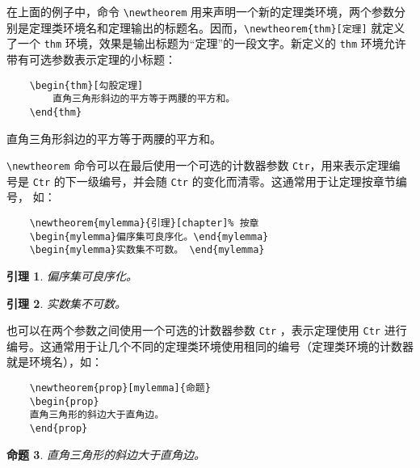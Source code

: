 在上面的例子中，命令 \verb|\newtheorem| 用来声明一个新的定理类环境，两个参数分别是定理类环境名和定理输出的标题名。因而，\verb|\newtheorem{thm}[定理]| 就定义了一个 \verb|thm| 环境，效果是输出标题为“定理”的一段文字。新定义的 \verb|thm| 环境允许带有可选参数表示定理的小标题：

\begin{minipage}[t]{0.45\textwidth}
\begin{lstlisting}
    \begin{thm}[勾股定理]
        直角三角形斜边的平方等于两腰的平方和。
    \end{thm}
\end{lstlisting}
\end{minipage}
\hfill
\begin{minipage}[t]{0.45\textwidth}
    \begin{thm}[勾股定理]
        直角三角形斜边的平方等于两腰的平方和。
    \end{thm}
\end{minipage}

\verb|\newtheorem| 命令可以在最后使用一个可选的计数器参数 \verb|Ctr|，用来表示定理编
号是 \verb|Ctr| 的下一级编号，并会随 \verb|Ctr| 的变化而清零。这通常用于让定理按章节编号，
如：

\begin{minipage}[t]{0.45\textwidth}
\begin{lstlisting}
    \newtheorem{mylemma}{引理}[chapter]% 按章
    \begin{mylemma}偏序集可良序化。\end{mylemma}
    \begin{mylemma}实数集不可数。 \end{mylemma}
\end{lstlisting}
\end{minipage}
\hfill
\begin{minipage}[t]{0.45\textwidth}
    \newtheorem{mylemma}{引理}[chapter]%
    \begin{mylemma}偏序集可良序化。\end{mylemma}
    \begin{mylemma}实数集不可数。 \end{mylemma}
\end{minipage}

也可以在两个参数之间使用一个可选的计数器参数 \verb|Ctr| ，表示定理使用 \verb|Ctr| 进行
编号。这通常用于让几个不同的定理类环境使用租同的编号（定理类环境的计数器就是环境名），如：

\begin{minipage}[t]{0.45\textwidth}
\begin{lstlisting}
    \newtheorem{prop}[mylemma]{命题}
    \begin{prop}
    直角三角形的斜边大于直角边。
    \end{prop}
\end{lstlisting}
\end{minipage}
\hfill
\begin{minipage}[t]{0.45\textwidth}
    \newtheorem{prop}[mylemma]{命题}
    \begin{prop}
    直角三角形的斜边大于直角边。
    \end{prop}
\end{minipage}

